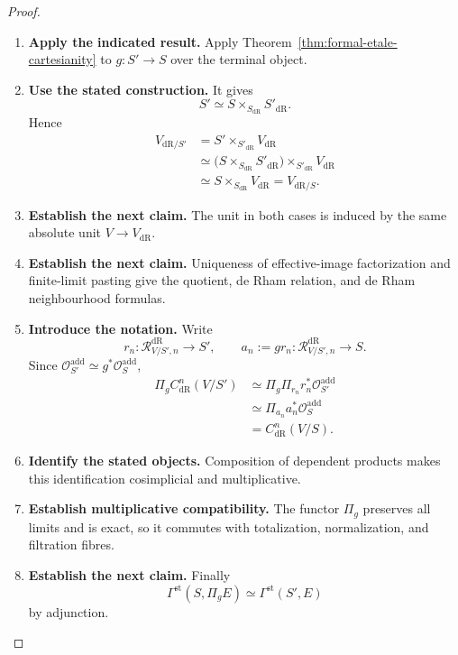 \begin{proof}
\leavevmode
\begin{enumerate}[label=\textup{(\arabic*)}]
    \item \textbf{Apply the indicated result.}
    Apply Theorem~\ref{thm:formal-etale-cartesianity} to \(g:S'\to S\) over
    the terminal object.
    \item \textbf{Use the stated construction.}
    It gives
    \[
    S'
    \simeq
    S\times_{S_{\mathrm{dR}}}S'_{\mathrm{dR}}.
    \]
    Hence
    \[
    \begin{aligned}
    V_{\mathrm{dR}/S'}
    &=
    S'\times_{S'_{\mathrm{dR}}}V_{\mathrm{dR}}\\
    &\simeq
    \bigl(S\times_{S_{\mathrm{dR}}}S'_{\mathrm{dR}}\bigr)
    \times_{S'_{\mathrm{dR}}}V_{\mathrm{dR}}\\
    &\simeq
    S\times_{S_{\mathrm{dR}}}V_{\mathrm{dR}}
    =
    V_{\mathrm{dR}/S}.
    \end{aligned}
    \]
    \item \textbf{Establish the next claim.}
    The unit in both cases is induced by the same absolute unit \(V\to V_{\mathrm{dR}}\).
    \item \textbf{Establish the next claim.}
    Uniqueness of effective-image factorization and finite-limit pasting give the quotient,
    de Rham relation, and de Rham neighbourhood formulas.
    \item \textbf{Introduce the notation.}
    Write
    \[
    r_n:\mathcal R^{\mathrm{dR}}_{V/S',n}\longrightarrow S',
    \qquad
    a_n:=gr_n:\mathcal R^{\mathrm{dR}}_{V/S',n}\longrightarrow S.
    \]
    Since
    \(\mathcal O_{S'}^{\mathrm{add}}\simeq g^*\mathcal O_S^{\mathrm{add}}\),
    \[
    \begin{aligned}
    \Pi_gC^n_{\mathrm{dR}}(V/S')
    &\simeq
    \Pi_g\Pi_{r_n}r_n^*\mathcal O_{S'}^{\mathrm{add}}\\
    &\simeq
    \Pi_{a_n}a_n^*\mathcal O_S^{\mathrm{add}}\\
    &=
    C^n_{\mathrm{dR}}(V/S).
    \end{aligned}
    \]
    \item \textbf{Identify the stated objects.}
    Composition of dependent products makes this identification cosimplicial and
    multiplicative.
    \item \textbf{Establish multiplicative compatibility.}
    The functor \(\Pi_g\) preserves all limits and is exact, so it
    commutes with totalization, normalization, and filtration fibres.
    \item \textbf{Establish the next claim.}
    Finally
    \[
    \Gamma^{\mathrm{st}}(S,\Pi_gE)
    \simeq
    \Gamma^{\mathrm{st}}(S',E)
    \]
    by adjunction.
\end{enumerate}
\end{proof}


